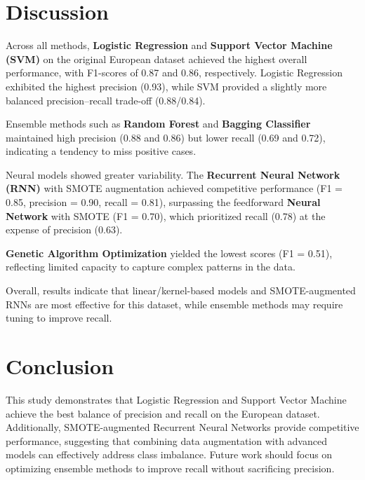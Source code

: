 \documentclass{article}
\begin{document}
\section*{Discussion}

Across all methods, \textbf{Logistic Regression} and \textbf{Support Vector Machine (SVM)} on the original European dataset achieved the highest overall performance, with F1-scores of 0.87 and 0.86, respectively. Logistic Regression exhibited the highest precision (0.93), while SVM provided a slightly more balanced precision–recall trade-off (0.88/0.84).

Ensemble methods such as \textbf{Random Forest} and \textbf{Bagging Classifier} maintained high precision (0.88 and 0.86) but lower recall (0.69 and 0.72), indicating a tendency to miss positive cases.

Neural models showed greater variability. The \textbf{Recurrent Neural Network (RNN)} with SMOTE augmentation achieved competitive performance (F1 = 0.85, precision = 0.90, recall = 0.81), surpassing the feedforward \textbf{Neural Network} with SMOTE (F1 = 0.70), which prioritized recall (0.78) at the expense of precision (0.63).

\textbf{Genetic Algorithm Optimization} yielded the lowest scores (F1 = 0.51), reflecting limited capacity to capture complex patterns in the data.

Overall, results indicate that linear/kernel-based models and SMOTE-augmented RNNs are most effective for this dataset, while ensemble methods may require tuning to improve recall.


\section*{Conclusion}

This study demonstrates that Logistic Regression and Support Vector Machine achieve the best balance of precision and recall on the European dataset. Additionally, SMOTE-augmented Recurrent Neural Networks provide competitive performance, suggesting that combining data augmentation with advanced models can effectively address class imbalance. Future work should focus on optimizing ensemble methods to improve recall without sacrificing precision.




\end{document}
